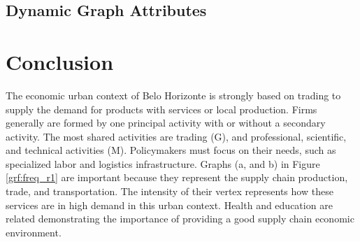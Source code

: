 \documentclass[12pt]{article}
\begin{document}
\subsection{Dynamic Graph Attributes}

\section{Conclusion}


The economic urban context of Belo Horizonte is strongly based on trading to supply the demand for products with services or local production. Firms generally are formed by one principal activity with or without a secondary activity. The most shared activities are trading (G), and professional, scientific, and technical activities (M). Policymakers must focus on their needs, such as specialized labor and logistics infrastructure. Graphs (a, and b) in Figure \ref{grf:freq_r1} are important because they represent the supply chain production, trade, and transportation. The intensity of their vertex represents how these services are in high demand in this urban context. Health and education are related demonstrating the importance of providing a good supply chain economic environment. 


\end{document}
